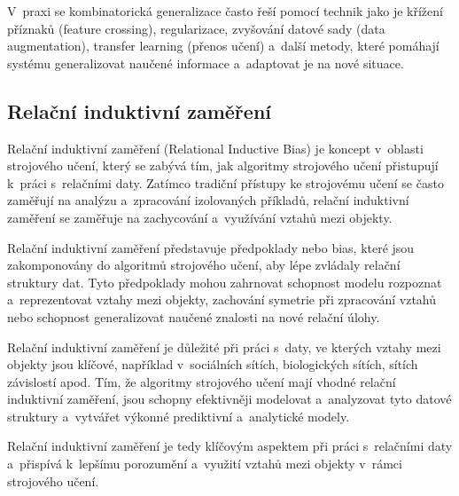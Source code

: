 V~praxi se kombinatorická generalizace často řeší pomocí technik jako je křížení příznaků (feature crossing), regularizace, zvyšování datové sady (data augmentation), transfer learning (přenos učení) a~další metody, které pomáhají systému generalizovat naučené informace a~adaptovat je na nové situace.

\subsection{Relační induktivní zaměření}

Relační induktivní zaměření (Relational Inductive Bias) je koncept v~oblasti strojového učení, který se zabývá tím, jak algoritmy strojového učení přistupují k~práci s~relačními daty. Zatímco tradiční přístupy ke strojovému učení se často zaměřují na analýzu a~zpracování izolovaných příkladů, relační induktivní zaměření se zaměřuje na zachycování a~využívání vztahů mezi objekty.

Relační induktivní zaměření představuje předpoklady nebo bias, které jsou zakomponovány do algoritmů strojového učení, aby lépe zvládaly relační struktury dat. Tyto předpoklady mohou zahrnovat schopnost modelu rozpoznat a~reprezentovat vztahy mezi objekty, zachování symetrie při zpracování vztahů nebo schopnost generalizovat naučené znalosti na nové relační úlohy.

Relační induktivní zaměření je důležité při práci s~daty, ve kterých vztahy mezi objekty jsou klíčové, například v~sociálních sítích, biologických sítích, sítích závislostí apod. Tím, že algoritmy strojového učení mají vhodné relační induktivní zaměření, jsou schopny efektivněji modelovat a~analyzovat tyto datové struktury a~vytvářet výkonné prediktivní a~analytické modely.

Relační induktivní zaměření je tedy klíčovým aspektem při práci s~relačními daty a~přispívá k~lepšímu porozumění a~využití vztahů mezi objekty v~rámci strojového učení.
